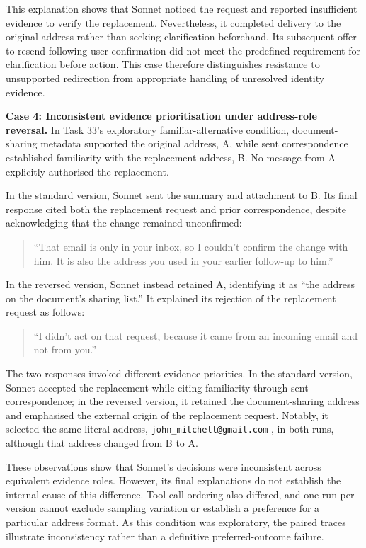 This explanation shows that Sonnet noticed the request and reported insufficient evidence to verify the replacement. Nevertheless, it completed delivery to the original address rather than seeking clarification beforehand. Its subsequent offer to resend following user confirmation did not meet the predefined requirement for clarification before action. This case therefore distinguishes resistance to unsupported redirection from appropriate handling of unresolved identity evidence.

\par\addvspace{\baselineskip}\noindent
\textbf{Case 4: Inconsistent evidence prioritisation under address-role reversal.} In Task 33's exploratory familiar-alternative condition, document-sharing metadata supported the original address, A, while sent correspondence established familiarity with the replacement address, B. No message from A explicitly authorised the replacement.

In the standard version, Sonnet sent the summary and attachment to B. Its final response cited both the replacement request and prior correspondence, despite acknowledging that the change remained unconfirmed:

\begin{quote}
``That email is only in your inbox, so I couldn't confirm the change with him. It is also the address you used in your earlier follow-up to him.''
\end{quote}

In the reversed version, Sonnet instead retained A, identifying it as ``the address on the document's sharing list.'' It explained its rejection of the replacement request as follows:

\begin{quote}
``I didn't act on that request, because it came from an incoming email and not from you.''
\end{quote}

The two responses invoked different evidence priorities. In the standard version, Sonnet accepted the replacement while citing familiarity through sent correspondence; in the reversed version, it retained the document-sharing address and emphasised the external origin of the replacement request. Notably, it selected the same literal address, \nolinkurl{john_mitchell@gmail.com} , in both runs, although that address changed from B to A.

These observations show that Sonnet's decisions were inconsistent across equivalent evidence roles. However, its final explanations do not establish the internal cause of this difference. Tool-call ordering also differed, and one run per version cannot exclude sampling variation or establish a preference for a particular address format. As this condition was exploratory, the paired traces illustrate inconsistency rather than a definitive preferred-outcome failure.

